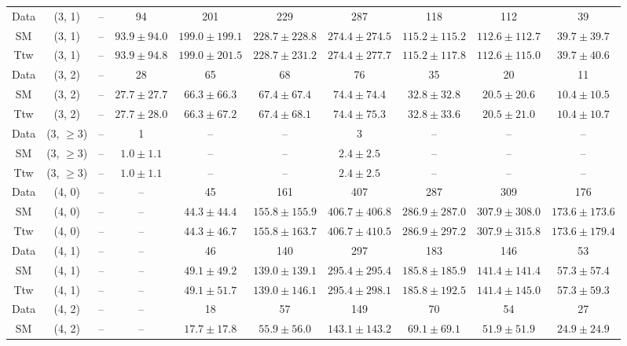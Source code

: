\begin{table}[h!]
{\begin{tabular}{cccccccccc}
	Data & (3, 1) & -- & 94 & 201 & 229 & 287 & 118 & 112 & 39 \\[0.5ex] 
	SM & (3, 1) & -- & $93.9\pm 94.0$ & $199.0\pm 199.1$ & $228.7\pm 228.8$ & $274.4\pm 274.5$ & $115.2\pm 115.2$ & $112.6\pm 112.7$ & $39.7\pm 39.7$ \\[0.5ex] 
	Ttw & (3, 1) & -- & $93.9\pm 94.8$ & $199.0\pm 201.5$ & $228.7\pm 231.2$ & $274.4\pm 277.7$ & $115.2\pm 117.8$ & $112.6\pm 115.0$ & $39.7\pm 40.6$ \\[0.5ex] 
	Data & (3, 2) & -- & 28 & 65 & 68 & 76 & 35 & 20 & 11 \\[0.5ex] 
	SM & (3, 2) & -- & $27.7\pm 27.7$ & $66.3\pm 66.3$ & $67.4\pm 67.4$ & $74.4\pm 74.4$ & $32.8\pm 32.8$ & $20.5\pm 20.6$ & $10.4\pm 10.5$ \\[0.5ex] 
	Ttw & (3, 2) & -- & $27.7\pm 28.0$ & $66.3\pm 67.2$ & $67.4\pm 68.1$ & $74.4\pm 75.3$ & $32.8\pm 33.6$ & $20.5\pm 21.0$ & $10.4\pm 10.7$ \\[0.5ex] 
	Data & (3, $\ge3$) & -- & 1 & -- & -- & 3 & -- & -- & -- \\[0.5ex] 
	SM & (3, $\ge3$) & -- & $1.0\pm 1.1$ & -- & -- & $2.4\pm 2.5$ & -- & -- & -- \\[0.5ex] 
	Ttw & (3, $\ge3$) & -- & $1.0\pm 1.1$ & -- & -- & $2.4\pm 2.5$ & -- & -- & -- \\[0.5ex] 
	Data & (4, 0) & -- & -- & 45 & 161 & 407 & 287 & 309 & 176 \\[0.5ex] 
	SM & (4, 0) & -- & -- & $44.3\pm 44.4$ & $155.8\pm 155.9$ & $406.7\pm 406.8$ & $286.9\pm 287.0$ & $307.9\pm 308.0$ & $173.6\pm 173.6$ \\[0.5ex] 
	Ttw & (4, 0) & -- & -- & $44.3\pm 46.7$ & $155.8\pm 163.7$ & $406.7\pm 410.5$ & $286.9\pm 297.2$ & $307.9\pm 315.8$ & $173.6\pm 179.4$ \\[0.5ex] 
	Data & (4, 1) & -- & -- & 46 & 140 & 297 & 183 & 146 & 53 \\[0.5ex] 
	SM & (4, 1) & -- & -- & $49.1\pm 49.2$ & $139.0\pm 139.1$ & $295.4\pm 295.4$ & $185.8\pm 185.9$ & $141.4\pm 141.4$ & $57.3\pm 57.4$ \\[0.5ex] 
	Ttw & (4, 1) & -- & -- & $49.1\pm 51.7$ & $139.0\pm 146.1$ & $295.4\pm 298.1$ & $185.8\pm 192.5$ & $141.4\pm 145.0$ & $57.3\pm 59.3$ \\[0.5ex] 
	Data & (4, 2) & -- & -- & 18 & 57 & 149 & 70 & 54 & 27 \\[0.5ex] 
	SM & (4, 2) & -- & -- & $17.7\pm 17.8$ & $55.9\pm 56.0$ & $143.1\pm 143.2$ & $69.1\pm 69.1$ & $51.9\pm 51.9$ & $24.9\pm 24.9$ \\[0.5ex] 

\end{tabular}}
\end{table}
